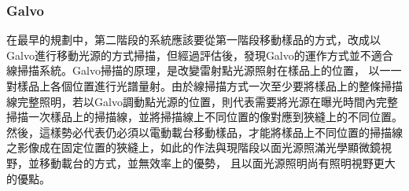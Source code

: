 \documentclass[12pt]{article}
\begin{document}
\subsubsection{Galvo}
在最早的規劃中，第二階段的系統應該要從第一階段移動樣品的方式，改成以Galvo進行移動光源的方式掃描，但經過評估後，發現Galvo的運作方式並不適合線掃描系統。Galvo掃描的原理，是改變雷射點光源照射在樣品上的位置，
以一一對樣品上各個位置進行光譜量射。由於線掃描方式一次至少要將樣品上的整條掃描線完整照明，若以Galvo調動點光源的位置，則代表需要將光源在曝光時間內完整掃描一次樣品上的掃描線，並將掃描線上不同位置的像對應到狹縫上的不同位置。
然後，這樣勢必代表仍必須以電動載台移動樣品，才能將樣品上不同位置的掃描線之影像成在固定位置的狹縫上，如此的作法與現階段以面光源照滿光學顯微鏡視野，並移動載台的方式，並無效率上的優勢，
且以面光源照明尚有照明視野更大的優點。
\end{document}
